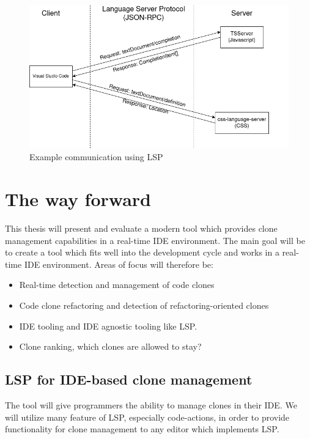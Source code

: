 \documentclass[12pt]{article}
\begin{document}
\begin{figure}
    \includegraphics[width=\textwidth]{images/lspcommunication.png}
    \caption{Example communication using LSP}
    \label{fig:lspcommunication}
\end{figure}


\section{The way forward}

This thesis will present and evaluate a modern tool which provides clone management
capabilities in a real-time IDE environment. The main goal will be to create a tool which
fits well into the development cycle and works in a real-time IDE environment. Areas of
focus will therefore be:

\begin{itemize}
	\item Real-time detection and management of code clones
	\item Code clone refactoring and detection of refactoring-oriented clones
	\item IDE tooling and IDE agnostic tooling like LSP.
	\item Clone ranking, which clones are allowed to stay?
\end{itemize}

\subsection{LSP for IDE-based clone management}

The tool will give programmers the ability to manage clones in their IDE. We will utilize
many feature of LSP, especially code-actions, in order to provide functionality for clone
management to any editor which implements LSP.
\end{document}
